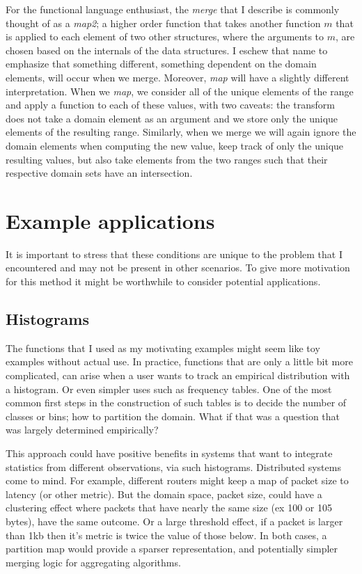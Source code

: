 \documentclass{article}
\begin{document}
For the functional language enthusiast, the \emph{merge} that I
describe is commonly thought of as a \emph{map2}; a higher order function that
takes another function $m$ that is applied to each element of two other
structures,
where the arguments to $m$,
are chosen based on the internals of the data structures.
I eschew that name to emphasize that something different,
something dependent on the domain elements,
will occur when we merge.
Moreover, \emph{map} will have a slightly different interpretation.
When we \emph{map},
we consider all of the unique elements of the range and
apply a function to each of these values,
with two caveats: the transform does not take a domain element as an
argument and we store only the unique elements of the resulting range.
Similarly, when we merge we will again ignore the domain elements when computing
the new value,
keep track of only the unique resulting values,
but also take elements from the two ranges such that their respective domain sets
have an intersection.

\section{Example applications}

It is important to stress that these conditions are unique to the problem that
I encountered and may not be present in other scenarios.
To give more motivation for this method it might be worthwhile to consider
potential applications.

\subsection{Histograms}

The functions that I used as my motivating examples might seem like toy
examples without actual use.
In practice,
functions that are only a little bit more complicated,
can arise when a user wants to track an empirical distribution with a histogram.
Or even simpler uses such as frequency tables.
One of the most common first steps in the construction of such tables is to
decide the number of classes or bins;
how to partition the domain.
What if that was a question that was largely determined empirically?

This approach could have positive benefits in systems that want to integrate
statistics from different observations, via such histograms.
Distributed systems come to mind.
For example, different routers might keep a map of packet size to latency
(or other metric).
But the domain space,
packet size,
could have a clustering effect
where packets that have nearly the same size
(ex 100 or 105 bytes),
have the same outcome.
Or a large threshold effect,
if a packet is larger than 1kb then it's metric is twice the value of
those below.
In both cases,
a partition map would provide a sparser representation,
and potentially simpler merging logic for aggregating algorithms.
\end{document}
